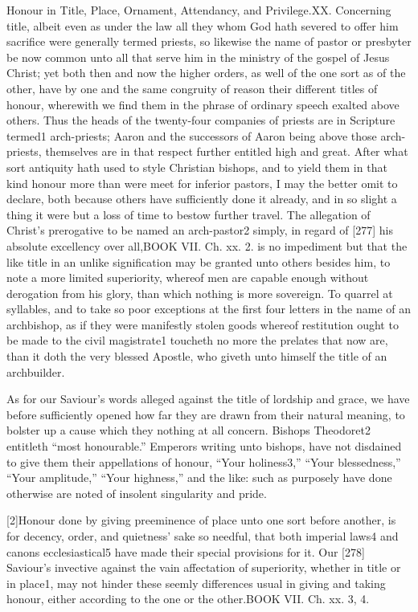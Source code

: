 Honour in Title, Place, Ornament, Attendancy, and Privilege.XX. Concerning title, albeit even as under the law all they whom God hath severed to offer him sacrifice were generally termed priests, so likewise the name of pastor or presbyter be now common unto all that serve him in the ministry of the gospel of Jesus Christ; yet both then and now the higher orders, as well of the one sort as of the other, have by one and the same congruity of reason their different titles of honour, wherewith we find them in the phrase of ordinary speech exalted above others. Thus the heads of the twenty-four companies of priests are in Scripture termed1 arch-priests; Aaron and the successors of Aaron being above those arch-priests, themselves are in that respect further entitled high and great. After what sort antiquity hath used to style Christian bishops, and to yield them in that kind honour more than were meet for inferior pastors, I may the better omit to declare, both because others have sufficiently done it already, and in so slight a thing it were but a loss of time to bestow further travel. The allegation of Christ’s prerogative to be named an arch-pastor2 simply, in regard of [277] his absolute excellency over all,BOOK VII. Ch. xx. 2. is no impediment but that the like title in an unlike signification may be granted unto others besides him, to note a more limited superiority, whereof men are capable enough without derogation from his glory, than which nothing is more sovereign. To quarrel at syllables, and to take so poor exceptions at the first four letters in the name of an archbishop, as if they were manifestly stolen goods whereof restitution ought to be made to the civil magistrate1 toucheth no more the prelates that now are, than it doth the very blessed Apostle, who giveth unto himself the title of an archbuilder.

As for our Saviour’s words alleged against the title of lordship and grace, we have before sufficiently opened how far they are drawn from their natural meaning, to bolster up a cause which they nothing at all concern. Bishops Theodoret2 entitleth “most honourable.” Emperors writing unto bishops, have not disdained to give them their appellations of honour, “Your holiness3,” “Your blessedness,” “Your amplitude,” “Your highness,” and the like: such as purposely have done otherwise are noted of insolent singularity and pride.

[2]Honour done by giving preeminence of place unto one sort before another, is for decency, order, and quietness’ sake so needful, that both imperial laws4 and canons ecclesiastical5 have made their special provisions for it. Our [278] Saviour’s invective against the vain affectation of superiority, whether in title or in place1, may not hinder these seemly differences usual in giving and taking honour, either according to the one or the other.BOOK VII. Ch. xx. 3, 4.

